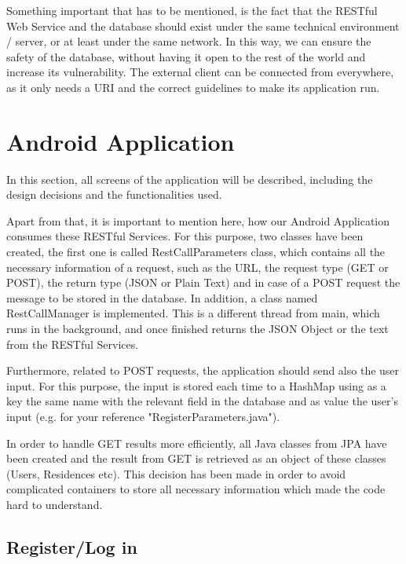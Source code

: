 \documentclass[12pt]{article}
\begin{document}
	
	Something important that has to be mentioned, is the fact that the RESTful Web Service and the database should exist under the same technical environment / server, or at least under the same network. In this way, we can ensure the safety of the database, without having it open to the rest of the world and increase its vulnerability. The external client can be connected from everywhere, as it only needs a URI and the correct guidelines to make its application run.
	
	
	\section{Android Application}
	
	In this section, all screens of the application will be described, including the design decisions and the functionalities used. 
	
	Apart from that, it is important to mention here, how our Android Application consumes these RESTful Services. For this purpose, two classes have been created, the first one is called RestCallParameters class, which contains all the necessary information of a request, such as the URL, the request type (GET or POST), the return type (JSON or Plain Text) and in case of a POST request the message to be stored in the database. In addition, a class named RestCallManager is implemented. This is a different thread from main, which runs in the background, and once finished returns the JSON Object or the text from the RESTful Services.
	
	Furthermore, related to POST requests, the application should send also the user input. For this purpose, the input is stored each time to a HashMap using as a key the same name with the relevant field in the database and as value the user's input (e.g. for your reference "RegisterParameters.java"). 
	
	In order to handle GET results more efficiently, all Java classes from JPA have been created and the result from GET is retrieved as an object of these classes (Users, Residences etc). This decision has been made in order to avoid complicated containers to store all necessary information which made the code hard to understand.
	
	\subsection{Register/Log in}
	
\end{document}
